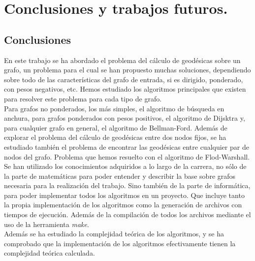 
\chapter{Conclusiones y trabajos futuros.}\label{ch:sexto-capitulo}

\section{Conclusiones}

En este trabajo se ha abordado el problema del cálculo de geodésicas sobre un grafo, un problema para el cual se han propuesto muchas soluciones, dependiendo sobre todo de las características del grafo de entrada, si es dirigido, ponderado, con pesos negativos, etc. Hemos estudiado los algoritmos principales que existen para resolver este problema para cada tipo de grafo. \\

Para grafos no ponderados, los más simples, el algoritmo de búsqueda en anchura, para grafos ponderados con pesos positivos, el algoritmo de Dijsktra y, para cualquier grafo en general, el algoritmo de Bellman-Ford. Además de explorar el problema del cálculo de geodésicas entre dos nodos fijos, se ha estudiado también el problema de encontrar las geodésicas entre cualquier par de nodos del grafo. Problema que hemos resuelto con el algoritmo de Flod-Warshall. \\

Se han utilizado los conocimientos adquiridos a lo largo de la carrera, no sólo de la parte de matemáticas para poder entender y describir la base sobre grafos necesaria para la realización del trabajo. Sino también de la parte de informática, para poder implementar todos los algoritmos en un proyecto. Que incluye tanto la propia implementación de los algoritmos como la generación de archivos con tiempos de ejecución. Además de la compilación de todos los archivos mediante el uso de la herramienta \textit{make}. \\

Además se ha estudiado la complejidad teórica de los algoritmos, y se ha comprobado que la implementación de los algoritmos efectivamente tienen la complejidad teórica calculada.

